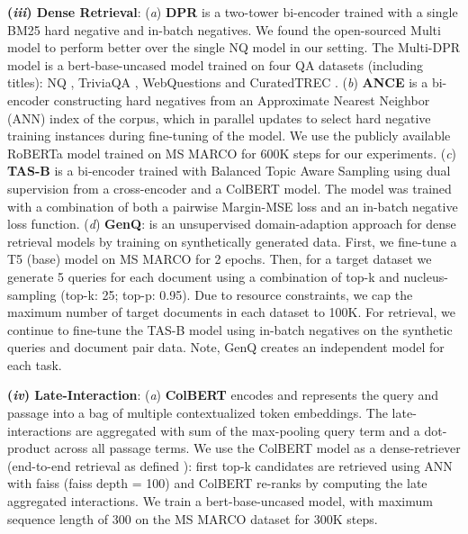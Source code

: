 \documentclass{article}
\begin{document}
\textbf{(\emph{iii}) Dense Retrieval}: 
(\emph{a}) \textbf{DPR} \cite{karpukhin-etal-2020-dense} is a two-tower bi-encoder trained with a single BM25 hard negative and in-batch negatives.  
We found the open-sourced Multi model to perform better over the single NQ model in our setting. The Multi-DPR model is a bert-base-uncased model trained on four QA datasets (including titles): NQ \cite{47761}, TriviaQA \cite{joshi-etal-2017-triviaqa}, WebQuestions \cite{berant-etal-2013-semantic} and CuratedTREC \cite{baudivs2015modeling}. 
(\emph{b}) \textbf{ANCE} \cite{xiong2020approximate} is a  bi-encoder constructing hard negatives from an Approximate Nearest Neighbor (ANN) index of the corpus, which in parallel updates to select hard negative training instances during fine-tuning of the model. We use the publicly available RoBERTa \cite{liu2019roberta} model trained on MS MARCO \cite{nguyen2016ms} for 600K steps for our experiments. 
(\emph{c}) \textbf{TAS-B} \cite{Hofstaetter2021_tasb_dense_retrieval} is a bi-encoder trained with Balanced Topic Aware Sampling using dual supervision from a cross-encoder and a ColBERT model. The model was trained with a combination of both a pairwise Margin-MSE \cite{hofstatter2021improving} loss and an in-batch negative loss function.
(\emph{d}) \textbf{GenQ}: is an unsupervised domain-adaption approach for dense retrieval models by training on synthetically generated data. First, we fine-tune a T5 (base) \cite{JMLR:v21:20-074} model on MS MARCO for 2 epochs. Then, for a target dataset we generate 5 queries for each document using a combination of top-k and nucleus-sampling (top-k: 25; top-p: 0.95). Due to resource constraints, we cap the maximum number of target documents in each dataset to 100K. For retrieval, we continue to fine-tune the TAS-B model using in-batch negatives on the synthetic queries and document pair data. Note, GenQ creates an independent model for each task.

\textbf{(\emph{iv}) Late-Interaction}: (\emph{a}) \textbf{ColBERT} \cite{10.1145/3397271.3401075} encodes and represents the query and passage into a bag of multiple contextualized token embeddings. The late-interactions are aggregated with sum of the max-pooling query term and a dot-product across all passage terms. We use the ColBERT model as a dense-retriever (end-to-end retrieval as defined \cite{10.1145/3397271.3401075}): first top-k candidates are retrieved using ANN with faiss \cite{JDH17} (faiss depth = 100) and ColBERT re-ranks by computing the late aggregated interactions. We train a bert-base-uncased model, with maximum sequence length of 300 on the MS MARCO dataset for 300K steps.
\end{document}

